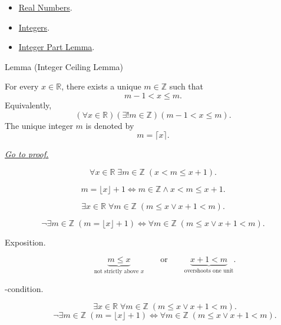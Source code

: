 \begin{dependencies}
\begin{itemize}
\item \hyperref[def:reals]{Real Numbers}.
\item \hyperref[def:integers]{Integers}.
\item \hyperref[lem:integer-part-lemma]{Integer Part Lemma}.
\end{itemize}
\end{dependencies}



\begin{lemmabox}{Lemma (Integer Ceiling Lemma)}
\begin{lemma}
\label{lem:integer-ceiling-lemma}
For every $x\in\mathbb{R}$, there exists a unique $m\in\mathbb{Z}$ such that
\[
  m-1<x\leq m.
\]
Equivalently,
\[
  (\forall x\in\mathbb{R})(\exists!m\in\mathbb{Z})(m-1<x\leq m).
\]
The unique integer $m$ is denoted by
\[
  m=\lceil x\rceil.
\]

\smallskip
\noindent
\hyperref[prf:integer-ceiling-lemma]{\textit{Go to proof.}}
\end{lemma}
\end{lemmabox}

\begin{remark*}
\[
\forall x\in\mathbb{R}\;\exists m\in\mathbb{Z}\;(x<m\le x+1).
\]
\end{remark*}

\begin{remark*}
\[
m=\lfloor x\rfloor+1
\Longleftrightarrow
m\in\mathbb{Z}\land x<m\le x+1.
\]
\end{remark*}

\begin{remark*}
\[
\exists x\in\mathbb{R}\;\forall m\in\mathbb{Z}\;(m\le x\lor x+1<m).
\]
\end{remark*}

\begin{remark*}
\[
\neg\exists m\in\mathbb{Z}\;(m=\lfloor x\rfloor+1)
\Longleftrightarrow
\forall m\in\mathbb{Z}\;(m\le x\lor x+1<m).
\]
\end{remark*}

\begin{remark*}
\begin{description}
  \item[Exposition.]
\[
\underbrace{m\le x}_{\text{not strictly above }x}
\qquad\text{or}\qquad
\underbrace{x+1<m}_{\text{overshoots one unit}}.
\]


  \item[\exists-condition.]
  \[
\exists x\in\mathbb{R}\;\forall m\in\mathbb{Z}\;(m\le x\lor x+1<m).
\]
\[
\neg\exists m\in\mathbb{Z}\;(m=\lfloor x\rfloor+1)
\Longleftrightarrow
\forall m\in\mathbb{Z}\;(m\le x\lor x+1<m).
\]
\end{description}
\end{remark*}

